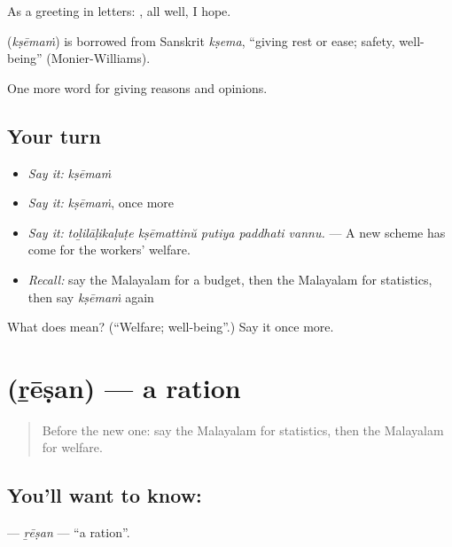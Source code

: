 As a greeting in letters:  , all well, I hope.

\begin{cousinweb}
\textbf{} (\emph{kṣēmaṁ}) is borrowed from Sanskrit \emph{kṣema}, \textquotedblleft{}giving rest or ease; safety, well-being\textquotedblright{} (Monier-Williams).
\end{cousinweb}

\begin{grammarlens}[title={What you've built}]
One more word for giving reasons and opinions.
\end{grammarlens}

\subsection*{Your turn}
\begin{itemize}
\raggedright
  \item \emph{Say it:} \emph{kṣēmaṁ}
  \item \emph{Say it:} \emph{kṣēmaṁ}, once more
  \item \emph{Say it:} \emph{toḻilāḷikaḷuṭe kṣēmattinŭ putiya paddhati vannu.} — A new scheme has come for the workers' welfare.
  \item \emph{Recall:} say the Malayalam for a budget, then the Malayalam for statistics, then say \emph{kṣēmaṁ} again
\end{itemize}

\begin{tcolorbox}[breakable,colback=teal!4,colframe=teal!35!black,title={Before you move on}]
What does  mean? (\textquotedblleft{}Welfare; well-being\textquotedblright{}.) Say it once more.
\end{tcolorbox}
\section[\texorpdfstring{\ml{റേഷൻ} (ṟēṣan)}{റേഷൻ (ṟēṣan)}]{ (ṟēṣan) — a ration}

\label{lesson:ML-C429-resan}



\begin{quote}
Before the new one: say the Malayalam for statistics, then the Malayalam for welfare.
\end{quote}

\subsection*{You'll want to know: }
\textbf{} — \emph{ṟēṣan} — \textquotedblleft{}a ration\textquotedblright{}.

